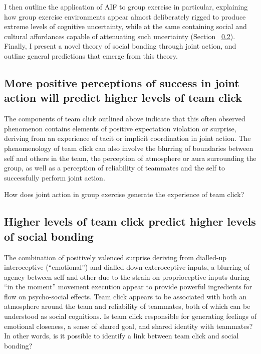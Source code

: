 \begin{CJK}{UTF8}{gbsn}
I then outline the application of AIF to group exercise in particular, explaining how group exercise environments appear almost deliberately rigged to produce extreme levels of cognitive uncertainty, while at the same containing social and cultural affordances capable of attenuating such uncertainty (Section ~\ref{}).  Finally, I present a novel theory of social bonding through joint action, and outline general predictions that emerge from this theory.



\subsection{More positive perceptions of success in joint action will predict higher levels of team click\label{sect:JASuccessTeamClick}}

    The components of team click outlined above indicate that this often observed phenomenon contains elements of positive expectation violation or surprise, deriving from an experience of tacit or implicit coordination in joint action.  The phenomenology of team click can also involve the blurring of boundaries between self and others in the team, the perception of atmosphere or aura surrounding the group, as well as a perception of reliability of teammates and the self to successfully perform joint action.

    How does joint action in group exercise generate the experience of team click?



\subsection{Higher levels of team click predict higher levels of social bonding \label{sect:teamClickSocialBonding}}

    The combination of positively valenced surprise deriving from dialled-up interoceptive (``emotional'') and dialled-down exteroceptive inputs, a blurring of agency between self and other due to the strain on proprioceptive inputs during ``in the moment'' movement execution appear to provide powerful ingredients for flow on psycho-social effects.  Team click appears to be associated with both an atmosphere around the team and reliability of teammates, both of which can be understood as social cognitions.  Is team click responsible for generating feelings of emotional closeness, a sense of shared goal, and shared identity with teammates?  In other words, is it possible to identify a link between team click and social bonding?


\end{CJK}
